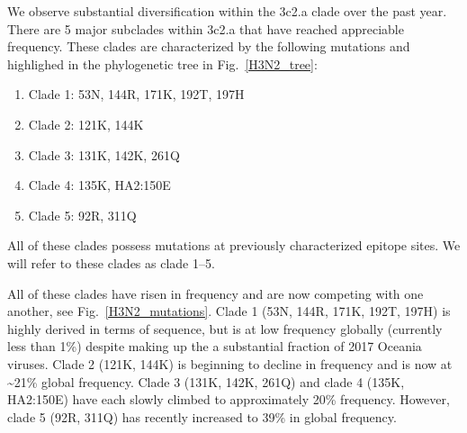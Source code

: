 \documentclass[11pt,oneside,letterpaper]{article}
\newcommand{\FIG}[1]{Fig.~\ref{#1}}
\begin{document}
We observe substantial diversification within the 3c2.a clade over the
past year. There are 5 major subclades within 3c2.a that have reached
appreciable frequency. These clades are characterized by the following
mutations and highlighed in the phylogenetic tree in \FIG{H3N2_tree}:

\begin{enumerate}
\item  Clade 1: 53N, 144R, 171K, 192T, 197H
\item  Clade 2: 121K, 144K
\item  Clade 3: 131K, 142K, 261Q
\item  Clade 4: 135K, HA2:150E
\item  Clade 5: 92R, 311Q
\end{enumerate}

All of these clades possess mutations at previously characterized
epitope sites. We will refer to these clades as clade 1--5.

All of these clades have risen in frequency and are now competing with
one another, see \FIG{H3N2_mutations}. Clade 1 (53N, 144R, 171K, 192T, 197H) is highly derived in
terms of sequence, but is at low frequency globally (currently less than
1\%) despite making up the a substantial fraction of 2017 Oceania
viruses. Clade 2 (121K, 144K) is beginning to decline in frequency and
is now at \textasciitilde{}21\% global frequency. Clade 3 (131K, 142K,
261Q) and clade 4 (135K, HA2:150E) have each slowly climbed to
approximately 20\% frequency. However, clade 5 (92R, 311Q) has recently
increased to 39\% in global frequency.
\end{document}
